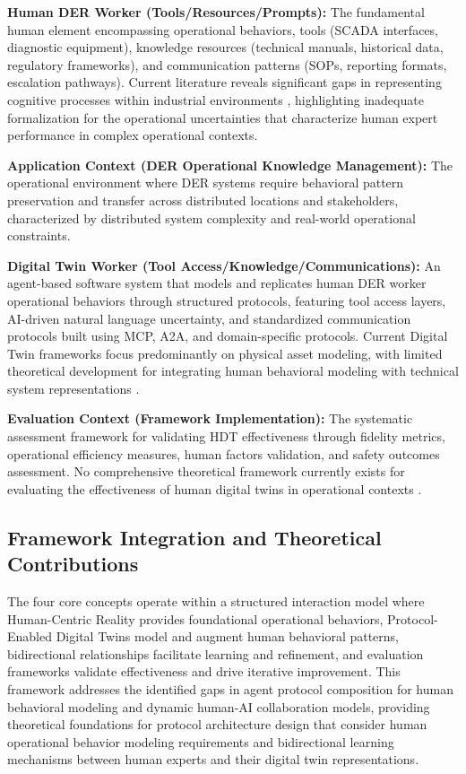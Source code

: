 \documentclass[12pt,a4paper]{article}
\begin{document}
\textbf{Human DER Worker (Tools/Resources/Prompts):} The fundamental human element encompassing operational behaviors, tools (SCADA interfaces, diagnostic equipment), knowledge resources (technical manuals, historical data, regulatory frameworks), and communication patterns (SOPs, reporting formats, escalation pathways). Current literature reveals significant gaps in representing cognitive processes within industrial environments \cite{10.1007/s44163-022-00020-w} \cite{10.1016/j.apergo.2018.07.016}, highlighting inadequate formalization for the operational uncertainties that characterize human expert performance in complex operational contexts.

\textbf{Application Context (DER Operational Knowledge Management):} The operational environment where DER systems require behavioral pattern preservation and transfer across distributed locations and stakeholders, characterized by distributed system complexity and real-world operational constraints.

\textbf{Digital Twin Worker (Tool Access/Knowledge/Communications):} An agent-based software system that models and replicates human DER worker operational behaviors through structured protocols, featuring tool access layers, AI-driven natural language uncertainty, and standardized communication protocols built using MCP, A2A, and domain-specific protocols. Current Digital Twin frameworks focus predominantly on physical asset modeling, with limited theoretical development for integrating human behavioral modeling with technical system representations \cite{10.1016/j.esr.2024.101334} \cite{10.1007/s10207-023-00784-x}.

\textbf{Evaluation Context (Framework Implementation):} The systematic assessment framework for validating HDT effectiveness through fidelity metrics, operational efficiency measures, human factors validation, and safety outcomes assessment. No comprehensive theoretical framework currently exists for evaluating the effectiveness of human digital twins in operational contexts \cite{10.1109/etfa61755.2024.10711109} \cite{10.1016/j.ifacol.2022.09.675}.

\subsection{Framework Integration and Theoretical Contributions}

The four core concepts operate within a structured interaction model where Human-Centric Reality provides foundational operational behaviors, Protocol-Enabled Digital Twins model and augment human behavioral patterns, bidirectional relationships facilitate learning and refinement, and evaluation frameworks validate effectiveness and drive iterative improvement. This framework addresses the identified gaps in agent protocol composition for human behavioral modeling and dynamic human-AI collaboration models, providing theoretical foundations for protocol architecture design that consider human operational behavior modeling requirements and bidirectional learning mechanisms between human experts and their digital twin representations.
\end{document}
